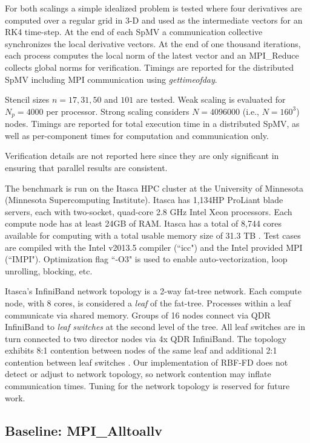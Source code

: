 \documentclass{report}
\begin{document}
For both scalings a simple idealized problem is tested where four derivatives are computed over a regular grid in 3-D and used as the intermediate vectors for an RK4 time-step. At the end of each SpMV a communication collective synchronizes the local derivative vectors. At the end of one thousand iterations, each process computes the local norm of the latest vector and an MPI\_Reduce collects global norms for verification. Timings are reported for the distributed SpMV including MPI communication using \emph{gettimeofday}.

Stencil sizes $n=17, 31, 50$ and $101$ are tested. Weak scaling is evaluated for $N_p=4000$ per processor. Strong scaling considers $N=4096000$ (i.e., $N=160^3$) nodes. Timings are reported for total execution time in a distributed SpMV, as well as per-component times for computation and communication only.


Verification details are not reported here since they are only significant in ensuring that parallel results are consistent. 


The benchmark is run on the Itasca HPC cluster at the University of Minnesota (Minnesota Supercomputing Institute). Itasca has 1,134HP ProLiant blade servers, each with two-socket, quad-core 2.8 GHz Intel Xeon processors. Each compute node has at least 24GB of RAM. Itasca has a total of 8,744 cores available for computing with a total usable memory size of 31.3 TB \cite{MSIItasca}. Test cases are compiled with the Intel v2013.5 compiler (``icc") and the Intel provided MPI (``IMPI"). Optimization flag ``-O3" is used to enable auto-vectorization, loop unrolling, blocking, etc.

Itasca's InfiniBand network topology is a 2-way fat-tree network. Each compute node, with 8 cores, is considered a \emph{leaf} of the fat-tree. Processes within a leaf communicate via shared memory. Groups of 16 nodes connect via QDR InfiniBand to \emph{leaf switches} at the second level of the tree. All leaf switches are in turn connected to two director nodes via 4x QDR InfiniBand. The topology exhibits 8:1 contention between nodes of the same leaf and additional 2:1 contention between leaf switches \cite{ItascaTuning}. Our implementation of RBF-FD does not detect or adjust to network topology, so network contention may inflate communication times. Tuning for the network topology is reserved for future work. 



\subsection{Baseline: MPI\_Alltoallv}
\end{document}
